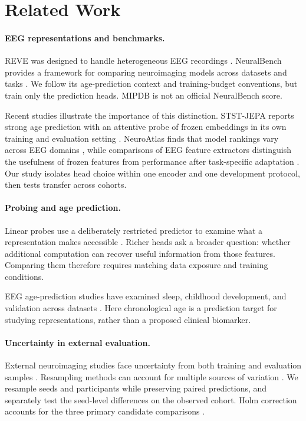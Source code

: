 \section{Related Work}

\paragraph{EEG representations and benchmarks.}
REVE was designed to handle heterogeneous EEG recordings
\citep{elouahidi2025reve}. NeuralBench provides a framework for comparing
neuroimaging models across datasets and tasks \citep{banville2026neuralbench}.
We follow its age-prediction context and training-budget conventions, but train
only the prediction heads. MIPDB is not an official NeuralBench score.

Recent studies illustrate the importance of this distinction. STST-JEPA reports
strong age prediction with an attentive probe of frozen embeddings in its own
training and evaluation setting \citep{segal2026ststjepa}. NeuroAtlas finds that
model rankings vary across EEG domains \citep{kontras2026neuroatlas}, while
comparisons of EEG feature extractors distinguish the usefulness of frozen
features from performance after task-specific adaptation
\citep{turgut2026feature}. Our study isolates head choice within one encoder and
one development protocol, then tests transfer across cohorts.

\paragraph{Probing and age prediction.}
Linear probes use a deliberately restricted predictor to examine what a
representation makes accessible \citep{alain2016probes}. Richer heads ask a
broader question: whether additional computation can recover useful information
from those features. Comparing them therefore requires matching data exposure
and training conditions.

EEG age-prediction studies have examined sleep, childhood development, and
validation across datasets \citep{sun2019brainage,vandenbosch2019age,
iyer2024growthchart,tveitstol2026robustness}. Here chronological age is a
prediction target for studying representations, rather than a proposed clinical
biomarker.

\paragraph{Uncertainty in external evaluation.}
External neuroimaging studies face uncertainty from both training and evaluation
samples \citep{rosenblatt2024power}. Resampling methods can account for multiple
sources of variation \citep{saravanan2020hierarchical}. We resample seeds and
participants while preserving paired predictions, and separately test the
seed-level differences on the observed cohort. Holm correction accounts for
the three primary candidate comparisons \citep{holm1979simple}.
